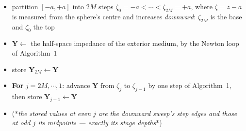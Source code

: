 \documentclass[11pt,a4paper]{article}
\newcommand{\bY}{\mathbf{Y}}
\begin{document}
\begin{minipage}{\linewidth}
\begin{itemize}
\item partition $[-a,+a]$ into $2M$ steps $\zeta_0=-a<\cdots<\zeta_{2M}=+a$,
      where $\zeta=z-a$ is measured from the sphere's centre and increases
      \emph{downward}: $\zeta_{2M}$ is the base and $\zeta_0$ the top
\item $\bY \leftarrow$ the half-space impedance of the exterior medium, by the
      Newton loop of Algorithm~1
\item store $\mathbf{Y}_{2M}\leftarrow\bY$
\item \textbf{For} $j=2M,\cdots,1$: advance $\bY$ from $\zeta_j$ to
      $\zeta_{j-1}$ by one step of Algorithm~1, then store
      $\mathbf{Y}_{j-1}\leftarrow\bY$
\item (*{\em the stored values at even $j$ are the downward sweep's step edges
      and those at odd $j$ its midpoints --- exactly its stage depths\/}*)
\end{itemize}
\end{minipage}
\end{document}
